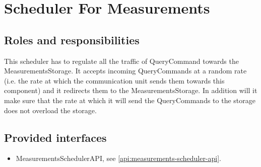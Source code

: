 \section{Scheduler For Measurements}
\label{element:scheduler-measurements}

\subsection{Roles and responsibilities}

\npar This scheduler has to regulate all the traffic of QueryCommand towards the
MeasurementsStorage. It accepts incoming QueryCommands at a random rate (i.e.
the rate at which the communication unit sends them towards this component) and
it redirects them to the MeasurementsStorage. In addition will it make sure
that the rate at which it will send the QueryCommands to the storage does not
overload the storage.

\subsection{Provided interfaces}

\begin{itemize}
  \item MeasurementsSchedulerAPI, see \ref{api:measurements-scheduler-api}.
\end{itemize}



